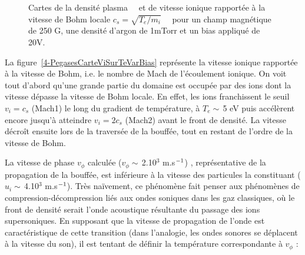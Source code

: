 \begin{refsection}
\begin{figure}[!htbp] 
  \centering
    \caption{Cartes de la densité plasma~~ et
    de vitesse ionique rapportée à la
    vitesse de Bohm locale
    $c_s=\sqrt{T_e/m_i}$~~ pour un champ
    magnétique de 250 G, une densité d'argon de 1mTorr et un bias appliqué de
    20V.}
    \label{4-PegasesVaguesIoniques}
\end{figure}
 
 La figure~\ref{4-PegasesCarteViSurTeVarBias} représente la vitesse ionique
 rapportée à la vitesse de Bohm, i.e. le nombre de Mach de
 l'écoulement ionique. On voit tout d'abord qu'une grande partie du domaine est
 occupée par des ions dont la vitesse dépasse la vitesse de Bohm locale. En
 effet, les ions franchissent le seuil $v_i=c_s$ (Mach1) le long du gradient de
 température, à $T_e\sim\,$5 eV puis accélèrent encore jusqu'à atteindre
 $v_i=2c_s$ (Mach2) avant le front de densité. La vitesse décroît ensuite lors
 de la traversée de la bouffée, tout en restant de l'ordre de la vitesse de
 Bohm.
 
 La vitesse de phase $v_\phi$ calculée ($v_\phi\sim\,$2.10$^3$
 m.s$^{{-1}}$) , représentative de la propagation de la bouffée, est inférieure à la
 vitesse des particules la constituant ($u_i\sim\,$4.10$^3$
 m.s$^{{-1}}$). Très naïvement, ce phénomène fait penser aux phénomènes
 de compression-décompression liés aux ondes soniques dans les gaz
 classiques, où le front de densité serait l'onde acoustique
 résultante du passage des ions supersoniques. En supposant que la vitesse de
 propagation de l'onde est caractéristique de cette transition (dans
 l'analogie, les ondes sonores se déplacent à la vitesse du son), il est
 tentant de définir la température correspondante à $v_\phi$ :
 

\end{refsection}
